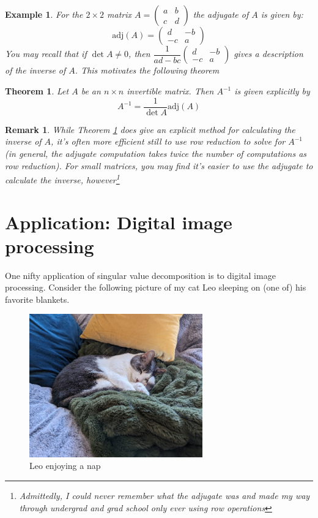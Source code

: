 \documentclass[12pt]{article}
\numberwithin{equation}{subsection}
\numberwithin{figure}{subsection}
\newtheorem{thm}[subsection]{Theorem}
\theoremstyle{note}
\newtheorem{example}[subsection]{Example}
\newtheorem{remark}[subsection]{Remark}
\newcommand\adj[1]{\mathrm{adj}(#1)}
\begin{document}
\begin{example}For the $2\times 2$ matrix $A=\begin{pmatrix} a & b \\ c & d\end{pmatrix}$ the adjugate of $A$ is given by: \[ \adj{A}=\begin{pmatrix} d & -b \\ -c & a\end{pmatrix}\]
You may recall that if $\det{A}\neq 0$, then $\dfrac{1}{ad-bc}\begin{pmatrix} d & -b \\ -c & a\end{pmatrix}$ gives a description of the inverse of $A$. This motivates the following theorem 
\end{example}

\begin{thm}\label{thm-adjugate-inv}
	Let $A$ be an $n\times n$ invertible matrix. Then $A^{-1}$ is given explicitly by \begin{equation} 
		A^{-1}=\dfrac{1}{\det A} \adj{A}
\end{equation}
\end{thm}


\begin{remark}
	While Theorem \ref{thm-adjugate-inv} does give an explicit method for calculating the inverse of $A$, it's often more efficient still to use row reduction to solve for $A^{-1}$ (in general, the adjugate computation takes twice the number of computations as row reduction). For small matrices, you may find it's easier to use the adjugate to calculate the inverse, however\footnote{Admittedly, I could never remember what the adjugate was and made my way through undergrad and grad school only ever  using row operations}
\end{remark}


\section{Application: Digital image processing}
\label{app-image}
	One nifty application of singular value decomposition is to digital image processing. Consider the following picture of my cat Leo sleeping on (one of) his favorite blankets.
	\begin{figure}[h]
	\centering
	 \includegraphics[width=75mm]{Images/leo}
	\caption{Leo enjoying a nap}
	\end{figure}
	
\end{document}
